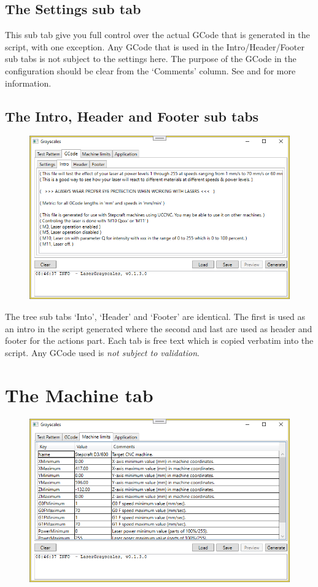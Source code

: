 \subsection{The Settings sub tab}\label{GCodeSettingsTab}

This sub tab give you full control over the actual GCode that is generated in the script, with one exception. Any GCode that is used in the Intro/Header/Footer sub tabs is
not subject to the settings here. The purpose of the GCode in the configuration should be clear from the `Comments' column. See  and
 for more information.

\subsection{The Intro, Header and Footer sub tabs}\label{GCodeIntroTab}
\begin{figure}[h!]
    \centering
    \includegraphics[width=0.8\linewidth]{./images/GCode-Intro.png}
\end{figure}

The tree sub tabs `Into', `Header' and `Footer' are identical. The first is used as an intro in the script generated where the second and last are used
as header and footer for the actions part. Each tab is free text which is copied verbatim into the script. Any GCode used is \emph{not subject to validation}.

\WarningCheckAndTest

\section{The Machine tab}\label{MachineTab}
\begin{figure}[h!]
    \centering
    \includegraphics[width=0.8\linewidth]{./images/Machine-limits.png}
\end{figure}

